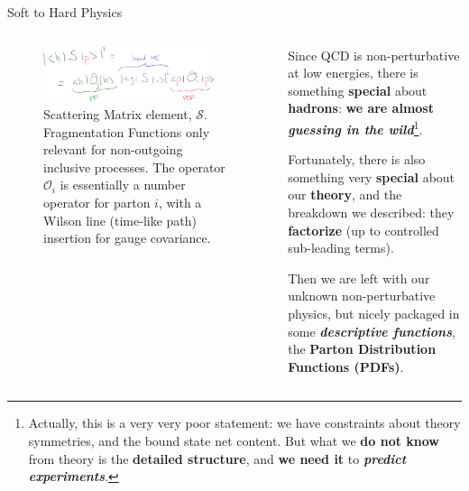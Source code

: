 \documentclass[9pt]{beamer}
\begin{document}
\begin{frame}{Soft to Hard Physics}
    \begin{columns}
        \begin{column}{0.5\textwidth}
            \begin{figure}
                \centering
                \includegraphics[width=0.9\textwidth]{hadronic-obs}
                \vspace*{10pt}
                \caption{
                    Scattering Matrix element, $\mathcal{S}$.
                    {
                        \footnotesize Fragmentation Functions only relevant for
                        non-outgoing inclusive processes.\newline
                        The operator $\mathcal{O}_i$ is essentially a number
                        operator for parton $i$, with a Wilson line (time-like
                        path) insertion for gauge covariance.
                    }
                }
            \end{figure}
        \end{column}
        \begin{column}{0.5\textwidth}
            Since QCD is non-perturbative at low energies, there is something
            \textbf{special} about \textbf{hadrons}: \textbf{we are almost
            \textit{guessing in the wild}}\footnote{
                Actually, this is a very very poor statement: we have
                constraints about theory symmetries, and the bound state net
                content. But what we \textbf{do not know} from theory is the
                \textbf{\alert{detailed structure}}, and \textbf{we need it} to
                \textit{\textbf{predict experiments}}.
            }.
            \vspace*{15pt}

            Fortunately, there is also something very \textbf{special} about
            our \textbf{theory}, and the breakdown we described: they
            \alert{\textbf{factorize}} (up to controlled sub-leading terms).
            \vspace*{15pt}

            Then we are left with our unknown non-perturbative physics, but
            nicely packaged in some \textbf{\textit{descriptive functions}},
            the \textbf{\alert{Parton Distribution Functions} (PDFs)}.
            \vspace*{25pt}
        \end{column}
    \end{columns}
\end{frame}
\end{document}
